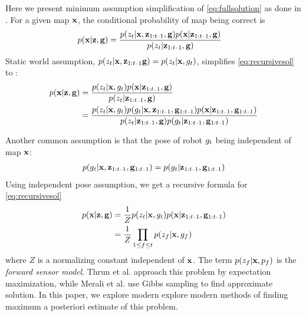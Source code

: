 \documentclass[letterpaper, 10 pt, conference]{ieeeconf} %
\begin{document}
   Here we present minimum assumption simplification of
   \eqref{eq:fullsolution} as done in \cite{thrun2003learning,merali2013icra}. 
   For a given map $\mathbf{x}$, the conditional
   probability of map being correct is
   \begin{align}
     p(\map | \measurements, \poses) &= \frac{p(\meas_t|\map , \measurements_{\prevtime}, \poses)p(\map| \measurements_{\prevtime},\poses)}
                            {p(\meas_t|\measurements_{\prevtime}, \poses)}
     \label{eq:recursivesol}
   \end{align}
   Static world assumption, $p(\meas_t|\map, \measurements_{\prevtime} \poses) = p(\meas_t|\map, \pose_t)$, simplifies \eqref{eq:recursivesol} to :
   \begin{align}
     p(\map|\measurements, \poses) &= \frac{p(\meas_t|\map, \pose_t)p(\map| \measurements_{\prevtime}, \poses)}
                          {p(\meas_t|\measurements_{\prevtime}, \poses)}\\
                  &= \frac{p(\meas_t|\map, \pose_t)p(\pose_t|\map, \pastobs)p(\map| \pastobs)}
                          {p(\meas_t|\measurements_{\prevtime}, \poses)p(\pose_t|\pastobs)}
   \end{align}

   Another common assumption is that the pose of robot $g_t$ being independent of map $\mathbf{x}$:
   \begin{align}
     p(\pose_t|\map, \pastobs) = p(\pose_t|\pastobs)
   \end{align}
   Using independent pose assumption, we get a recursive formula for \eqref{eq:recursivesol}
   \begin{align}
     p(\map | \measurements, \poses) &= \frac{1}{Z} p(\meas_t|\map , \pose_t)p(\map| \measurements_{\prevtime}, \poses_{\prevtime})\\
                       &= \frac{1}{Z} \prod_{1 \le f \le t} p(\meas_f|\map, \pose_f)
     \label{eq:map}
   \end{align}
   where $Z$ is a normalizing constant independent of $\mathbf{x}$. The term $p(z_f|\mathbf{x}, p_f)$ is the \emph{forward sensor model}. Thrun et al. \cite{thrun2003learning} approach this problem by expectation maximization, while Merali et al. \cite{merali2013icra} use Gibbs sampling to find approximate solution. In this paper, we explore modern explore modern methods of finding maximum a posteriori estimate of this problem.
\end{document}
